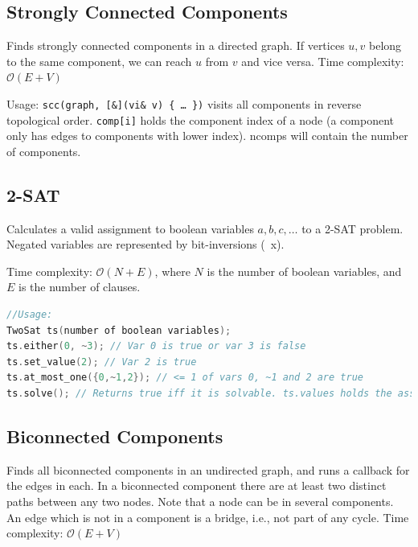 \documentclass{article}
\begin{document}



\subsection*{Strongly Connected Components}

Finds strongly connected components in a directed graph. If vertices $u, v$ belong to the same component, we can reach $u$ from $v$ and vice versa.
Time complexity: $\mathcal{O}(E + V)$

Usage: \texttt{scc(graph, [\&](vi\& v) \{ \ldots \ \})} visits all components
in reverse topological order. \texttt{comp[i]} holds the component
index of a node (a component only has edges to components with
lower index). ncomps will contain the number of components.



\pagebreak

\subsection*{2-SAT}

Calculates a valid assignment to boolean variables $a, b, c,\ldots$ to a 2-SAT problem.
Negated variables are represented by bit-inversions (~x).

Time complexity: $\mathcal{O}(N+E)$, where $N$ is the number of boolean variables, and $E$ is the number of clauses.


\begin{lstlisting}[language=C++, aboveskip=0pt]
//Usage:
TwoSat ts(number of boolean variables);
ts.either(0, ~3); // Var 0 is true or var 3 is false
ts.set_value(2); // Var 2 is true
ts.at_most_one({0,~1,2}); // <= 1 of vars 0, ~1 and 2 are true
ts.solve(); // Returns true iff it is solvable. ts.values holds the assigned values to the variables
\end{lstlisting}


\subsection*{Biconnected Components}

Finds all biconnected components in an undirected graph, and
runs a callback for the edges in each. In a biconnected component there
are at least two distinct paths between any two nodes. Note that a node can
be in several components. An edge which is not in a component is a bridge,
i.e., not part of any cycle. Time complexity: $\mathcal{O}(E + V)$
\end{document}
